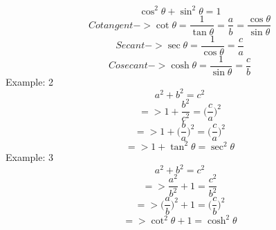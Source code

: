 \begin{equation}
\cos^2\theta+\sin^2\theta = 1
\end{equation}
\newline
\begin{equation}
Cotangent->\cot\theta = \frac{1}{\tan\theta} = \frac{a}{b} = \frac{\cos\theta}{\sin\theta}
\end{equation}
\begin{equation}
Secant->\sec\theta = \frac{1}{\cos\theta} = \frac{c}{a}
\end{equation}
\begin{equation}
Cosecant->\cosh\theta = \frac{1}{\sin\theta}=\frac{c}{b}
\end{equation}
\newline
Example: 2
\begin{equation}
a^2+b^2=c^2
\end{equation}
\begin{displaymath}
=>1+\frac{b^2}{c^2}=\bigg(\frac{c}{a}\bigg)^2
\end{displaymath}
\begin{displaymath}
=> 1+\bigg(\frac{b}{a}\bigg)^2=\bigg(\frac{c}{a}\bigg)^2
\end{displaymath}
\begin{displaymath}
=> 1+\tan^2\theta = \sec^2\theta
\end{displaymath}
\newline
Example: 3
\begin{equation}
a^2+b^2=c^2
\end{equation}
\begin{displaymath}
=>\frac{a^2}{b^2}+1 = \frac{c^2}{b^2}
\end{displaymath}
\begin{displaymath}
=> \bigg(\frac{a}{b}\bigg)^2+1= \bigg(\frac{c}{b}\bigg)^2
\end{displaymath}
\begin{displaymath}
=> \cot^2\theta+1=\cosh^2\theta
\end{displaymath}

